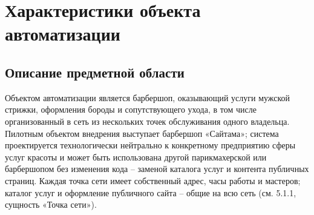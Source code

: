 \section{Характеристики объекта автоматизации}

\subsection{Описание предметной области}

Объектом автоматизации является барбершоп, оказывающий услуги мужской стрижки, оформления бороды и сопутствующего ухода, в том числе организованный в сеть из нескольких точек обслуживания одного владельца. Пилотным объектом внедрения выступает барбершоп «Сайтама»; система проектируется технологически нейтрально к конкретному предприятию сферы услуг красоты и может быть использована другой парикмахерской или барбершопом без изменения кода -- заменой каталога услуг и контента публичных страниц. Каждая точка сети имеет собственный адрес, часы работы и мастеров; каталог услуг и оформление публичного сайта -- общие на всю сеть (см. 5.1.1, сущность «Точка сети»).

